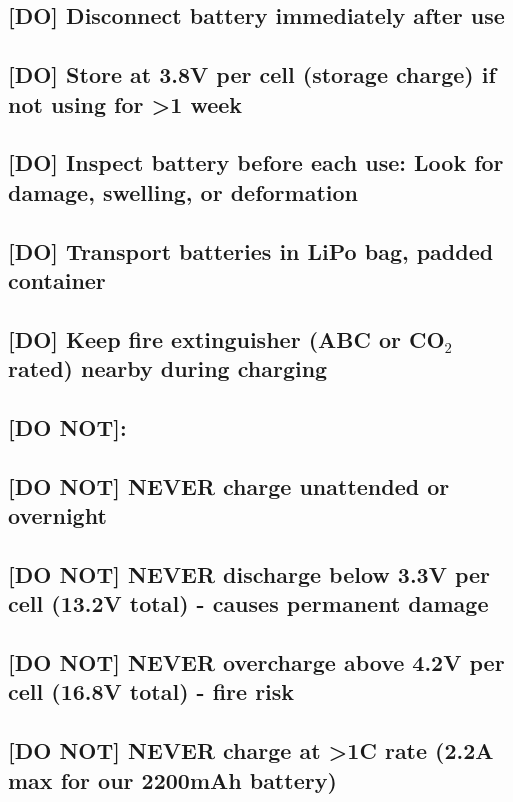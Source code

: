 \documentclass[11pt,letterpaper]{article}
\begin{document}
\subsection*{[DO] Disconnect battery immediately after use}

\subsection*{[DO] Store at 3.8V per cell (storage charge) if not using for >1 week}

\subsection*{[DO] Inspect battery before each use: Look for damage, swelling, or deformation}

\subsection*{[DO] Transport batteries in LiPo bag, padded container}

\subsection*{[DO] Keep fire extinguisher (ABC or CO$_2$ rated) nearby during charging}

\subsection*{[DO NOT]:}

\subsection*{[DO NOT] NEVER charge unattended or overnight}

\subsection*{[DO NOT] NEVER discharge below 3.3V per cell (13.2V total) - causes permanent damage}

\subsection*{[DO NOT] NEVER overcharge above 4.2V per cell (16.8V total) - fire risk}

\subsection*{[DO NOT] NEVER charge at >1C rate (2.2A max for our 2200mAh battery)}
\end{document}
